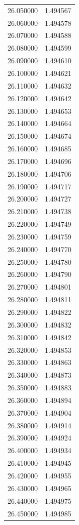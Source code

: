 \begin{tabular}{rr}
26.050000 & 1.494567 \\
26.060000 & 1.494578 \\
26.070000 & 1.494588 \\
26.080000 & 1.494599 \\
26.090000 & 1.494610 \\
26.100000 & 1.494621 \\
26.110000 & 1.494632 \\
26.120000 & 1.494642 \\
26.130000 & 1.494653 \\
26.140000 & 1.494664 \\
26.150000 & 1.494674 \\
26.160000 & 1.494685 \\
26.170000 & 1.494696 \\
26.180000 & 1.494706 \\
26.190000 & 1.494717 \\
26.200000 & 1.494727 \\
26.210000 & 1.494738 \\
26.220000 & 1.494749 \\
26.230000 & 1.494759 \\
26.240000 & 1.494770 \\
26.250000 & 1.494780 \\
26.260000 & 1.494790 \\
26.270000 & 1.494801 \\
26.280000 & 1.494811 \\
26.290000 & 1.494822 \\
26.300000 & 1.494832 \\
26.310000 & 1.494842 \\
26.320000 & 1.494853 \\
26.330000 & 1.494863 \\
26.340000 & 1.494873 \\
26.350000 & 1.494883 \\
26.360000 & 1.494894 \\
26.370000 & 1.494904 \\
26.380000 & 1.494914 \\
26.390000 & 1.494924 \\
26.400000 & 1.494934 \\
26.410000 & 1.494945 \\
26.420000 & 1.494955 \\
26.430000 & 1.494965 \\
26.440000 & 1.494975 \\
26.450000 & 1.494985 \\

\end{tabular}
